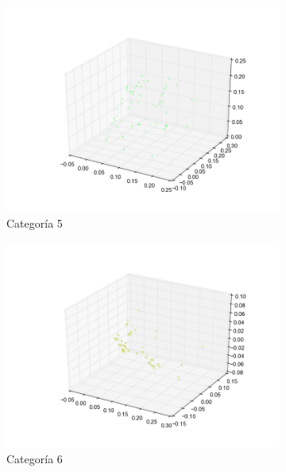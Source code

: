 \begin{figure}[H]
\begin{subfigure}[b]{0.33\textwidth}
                \includegraphics[width=\linewidth]{secciones/graficos/oja/categoria_5.png}
                \caption{Categoría 5}
                \label{fig: ej1_oja_categoria_5}
        \end{subfigure}
        \begin{subfigure}[b]{0.33\textwidth}
                \includegraphics[width=\linewidth]{secciones/graficos/oja/categoria_6.png}
                \caption{Categoría 6}
                \label{fig: ej1_oja_categoria_6}
        \end{subfigure}
        \begin{subfigure}[b]{0.33\textwidth}

\end{subfigure}
\end{figure}

